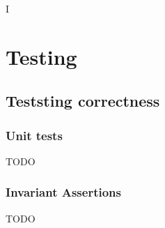 I%

\chapter{Testing} %

\label{Testing} %



\section{Teststing correctness}

\subsection{Unit tests}
\color{red} TODO \color{black}

\subsection{Invariant Assertions}
\color{red} TODO \color{black}


